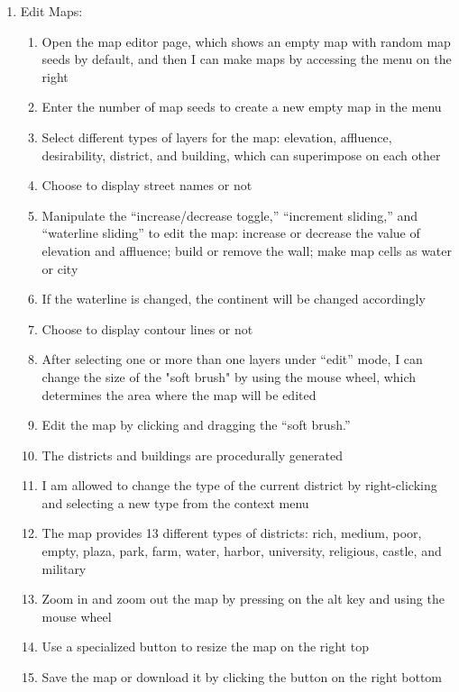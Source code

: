 \begin{enumerate}
\begin{enumerate}
    \item Edit Maps:
    \begin{enumerate}
      \item Open the map editor page, which shows an empty map with random map seeds by default, and then I can make maps by accessing the menu on the right
    	\item Enter the number of map seeds to create a new empty map in the menu
    	\item Select different types of layers for the map: elevation, affluence, desirability, district, and building, which can superimpose on each other
      \item Choose to display street names or not
      \item Manipulate the ``increase/decrease toggle,'' ``increment sliding,'' and ``waterline sliding'' to edit the map: increase or decrease the value of elevation and affluence; build or remove the wall; make map cells as water or city
      \item If the waterline is changed, the continent will be changed accordingly
      \item Choose to display contour lines or not
      \item After selecting one or more than one layers under ``edit'' mode, I can change the size of the "soft brush" by using the mouse wheel, which determines the area where the map will be edited
      \item Edit the map by clicking and dragging the ``soft brush.''
      \item The districts and buildings are procedurally generated
      \item I am allowed to change the type of the current district by right-clicking and selecting a new type from the context menu
      \item The map provides 13 different types of districts: rich, medium, poor, empty, plaza, park, farm, water, harbor, university, religious, castle, and military
      \item Zoom in and zoom out the map by pressing on the alt key and using the mouse wheel
      \item Use a specialized button to resize the map on the right top
      \item Save the map or download it by clicking the button on the right bottom
    \end{enumerate}
  \end{enumerate}
\end{enumerate}

